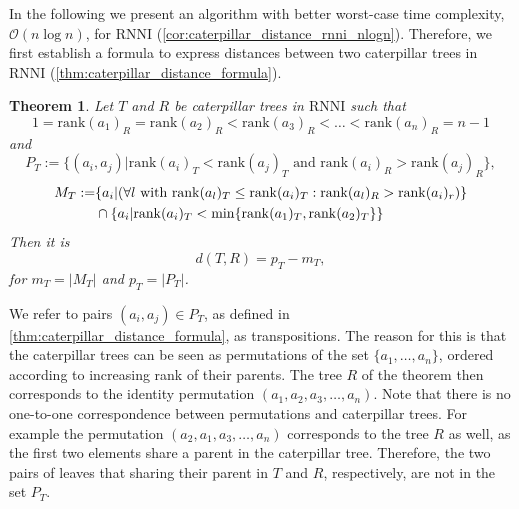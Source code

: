 \documentclass[11pt]{amsart}
\newtheorem{theorem}{Theorem}
\newcommand{\rnni}{\mathrm{RNNI}}
\newcommand{\rank}{\mathrm{rank}}
\renewcommand{\O}{\mathcal O}
\begin{document}
In the following we present an algorithm with better worst-case time complexity, $\O(n \log n)$, for $\rnni$ (\autoref{cor:caterpillar_distance_rnni_nlogn}).
Therefore, we first establish a formula to express distances between two caterpillar trees in $\rnni$ (\autoref{thm:caterpillar_distance_formula}).

\begin{theorem}
	Let $T$ and $R$ be caterpillar trees in $\rnni$ such that \[1 = \rank(a_1)_R = \rank(a_2)_R < \rank(a_3)_R < \ldots < \rank(a_n)_R = n-1\]
	and
	\[P_T := \{(a_i,a_j)| \rank(a_i)_T < \rank(a_j)_T \text{ and } \rank(a_i)_R > \rank(a_j)_R\},\]
	\begin{align*}
		M_T := &\{a_i| (\forall l \textnormal{ with } \rank(a_l)_T \leq \rank(a_i)_T: \rank(a_l)_R > \rank(a_i)_r)\} \\
		& \cap \{a_i | \rank(a_i)_T < \min\{\rank(a_1)_T, \rank(a_2)_T\}\}
	\end{align*}
	Then it is
	\[d(T,R) = p_T - m_T,\]
	for ${m_T = |M_T|}$ and ${p_T = |P_T|}$.
	\label{thm:caterpillar_distance_formula}
\end{theorem}

We refer to pairs $(a_i,a_j) \in P_T$, as defined in \autoref{thm:caterpillar_distance_formula}, as transpositions.
The reason for this is that the caterpillar trees can be seen as permutations of the set $\{a_1, \ldots, a_n\}$, ordered according to increasing rank of their parents.
The tree $R$ of the theorem then corresponds to the identity permutation $(a_1, a_2, a_3, \ldots, a_n)$.
Note that there is no one-to-one correspondence between permutations and caterpillar trees.
For example the permutation $(a_2, a_1, a_3, \ldots, a_n)$ corresponds to the tree $R$ as well, as the first two elements share a parent in the caterpillar tree.
Therefore, the two pairs of leaves that sharing their parent in $T$ and $R$, respectively, are not in the set $P_T$.
\end{document}
